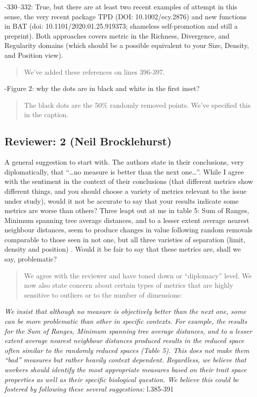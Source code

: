 \documentclass[]{article}
\begin{document}
-330--332: True, but there are at least two recent examples of attempt
in this sense, the very recent package TPD (DOI: 10.1002/ecy.2876) and
new functions in BAT (doi: 10.1101/2020.01.25.919373; shameless
self-promotion and still a preprint). Both approaches covers metric in
the Richness, Divergence, and Regularity domains (which should be a
possible equivalent to your Size, Density, and Position view).

\begin{quote}
We've added these references on lines 396-397.
\end{quote}

-Figure 2: why the dots are in black and white in the first inset?

\begin{quote}
The black dots are the 50\% randomly removed points. We've specified
this in the caption.
\end{quote}

\subsection{Reviewer: 2 (Neil
Brocklehurst)}\label{reviewer-2-neil-brocklehurst}

A general suggestion to start with. The authors state in their
conclusions, very diplomatically, that ``\ldots{}no measure is better
than the next one\ldots{}''. While I agree with the sentiment in the
context of their conclusions (that different metrics show different
things, and you should choose a variety of metrics relevant to the issue
under study), would it not be accurate to say that your results indicate
some metrics are worse than others? Three leapt out at me in table 5:
Sum of Ranges, Minimum spanning tree average distances, and to a lesser
extent average nearest neighbour distances, seem to produce changes in
value following random removals comparable to those seen in not one, but
all three varieties of separation (limit, density and position) . Would
it be fair to say that these metrics are, shall we say, problematic?

\begin{quote}
We agree with the reviewer and have toned down or ``diplomacy'' level.
We now also state concern about certain types of metrics that are highly
sensitive to outliers or to the number of dimensions:
\end{quote}

\textit{We insist that although no measure is objectively better than the next
one, some can be more problematic than other in specific contexts. For
example, the results for the Sum of Ranges, Minimum spanning tree
average distances, and to a lesser extent average nearest neighbour
distances produced results in the reduced space often similar to the
randomly reduced spaces (Table 5). This does not make them ``bad''
measures but rather heavily context dependent. Regardless, we believe
that workers should identify the most appropriate measures based on
their trait space properties as well as their specific biological
question. We believe this could be fostered by following these several
suggestions:} l.385-391
\end{document}
